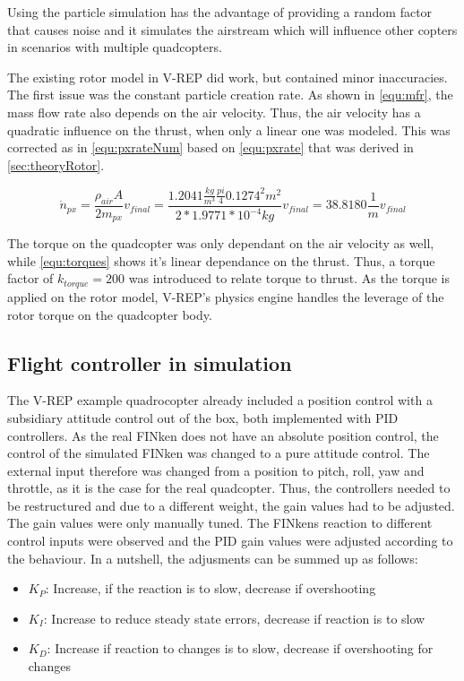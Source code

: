 Using the particle simulation has the advantage of providing a  random factor that causes noise and it simulates the airstream which will influence other copters in scenarios with multiple quadcopters.

The existing rotor model in V-REP did work, but contained minor inaccuracies. The first issue was the constant particle creation rate. As shown in \ref{equ:mfr}, the mass flow rate also depends on the air velocity. Thus, the air velocity has a quadratic influence on the thrust, when only a linear one was modeled. This was corrected as in \ref{equ:pxrateNum} based on  \ref{equ:pxrate} that was derived in \ref{sec:theoryRotor}.

  \begin{equation}
    \dot n_{px} = \frac{\rho_{air} A}{2m_{px}} v_{final} = \frac{1.2041 \frac{kg}{m^3} \frac{pi}{4} 0.1274^2 m^2}{2 * 1.9771 * 10^{-4} kg} v_{final} = 38.8180 \frac{1}{m}v_{final}
    \label{equ:pxrateNum}
    \end{equation}
    
   The torque on the quadcopter was only dependant on the air velocity as well, while \ref{equ:torques} shows it's linear dependance on the thrust. Thus, a torque factor of $k_{torque} = 200$ was introduced to relate torque to thrust. 
   As the torque is applied on the rotor model, V-REP's physics engine handles the leverage of the rotor torque on the quadcopter body.





\subsection{Flight controller in simulation}

The V-REP example quadrocopter already included a position control with a subsidiary attitude control out of the box, both implemented with \gls{PID} controllers.
As the real FINken does not have an absolute position control, the control of the simulated FINken was changed to a pure attitude control.
The external input therefore was changed from a position to pitch, roll, yaw and throttle, as it is the case for the real quadcopter.
Thus, the controllers needed to be restructured and due to a different weight, the gain values had to be adjusted.
The gain values were only manually tuned. 
The FINkens reaction to different control inputs were observed and the \gls{PID} gain values were adjusted according to the behaviour.
In a nutshell, the adjusments can be summed up as follows:
\begin{itemize}
	\item{$K_P$: Increase, if the reaction is to slow, decrease if overshooting}
	\item{$K_I$: Increase to reduce steady state errors, decrease if reaction is to slow}
	\item{$K_D$: Increase if reaction to changes is to slow, decrease if overshooting for changes}
\end{itemize}

